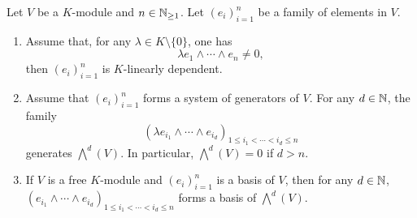 \begin{theoremenv}\label{thm:4.5.2}
    Let $V$ be a $K$-module and $n\in \mathbb{N}_{\ge 1}$.
    Let $\left(e_i\right)_{i=1}^{n}$ be a family of elements in $V$.
    \begin{enumerate}
        \item Assume that, for any $\lambda \in K\setminus\{0\}$, one has
        $$\lambda e_1 \wedge \cdots \wedge e_n \neq 0,$$
        then $\left(e_i\right)_{i=1}^{n}$ is $K$-linearly dependent.
        \item Assume that $\left(e_i\right)_{i=1}^{n}$ forms a system of generators of $V$.
        For any $d \in \mathbb{N}$, the family
        $$ \left(\lambda e_{i_1} \wedge \cdots \wedge e_{i_d}\right)_{1\le i_1< \cdots < i_d \le n}$$
        generates $\bigwedge^d (V)$.
        In particular, $\bigwedge^d (V) = 0$ if $d>n$.
        \item If $V$ is a free $K$-module and $\left(e_i\right)_{i=1}^{n}$ is a basis of $V$,
        then for any $d\in \mathbb{N}$, $\left(e_{i_1} \wedge \cdots \wedge e_{i_d}\right)_{1\le i_1 < \cdots < i_d \le n}$ forms a basis of $\bigwedge^d (V)$.
    \end{enumerate}
\end{theoremenv}
